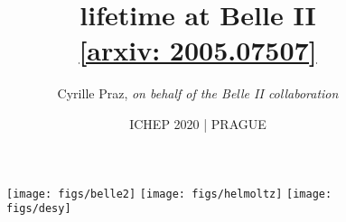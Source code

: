 \title[\B lifetime at Belle II]{\B lifetime at Belle II \\ \vspace{0.5cm}\small \href{https://arxiv.org/abs/2005.07507}{\color{blue!40!gray}[arxiv: 2005.07507]}}
\author[Cyrille Praz]{Cyrille Praz, \emph{on behalf of the Belle II collaboration}}
\date[30.07.2020]{ICHEP 2020 | PRAGUE}
\begin{frame}
\begin{figure}
\begin{center}
\texttt{[image: figs/belle2]}
\hspace{0.5cm}
\texttt{[image: figs/helmoltz]}
\hspace{0.5cm}
\texttt{[image: figs/desy]}
\end{center}
\end{figure}
\vspace{-0.5cm}
\titlepage
\end{frame}

